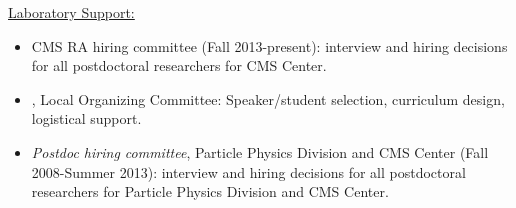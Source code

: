 \documentclass [12pt]{report}
\begin{document}
\noindent\underline{Laboratory Support:}

\begin{itemize}
\item{CMS RA hiring committee (Fall 2013-present):  interview and hiring decisions for all postdoctoral researchers for CMS Center.}		
\item{, Local Organizing Committee:  Speaker/student selection, curriculum design, logistical support. 
}
\item{\textit{Postdoc hiring committee}, Particle Physics Division and CMS Center (Fall 2008-Summer 2013):  interview and hiring decisions for all postdoctoral researchers for Particle Physics Division and CMS Center.   
}

\end{itemize}

\clearpage
\newpage
\end{document}
